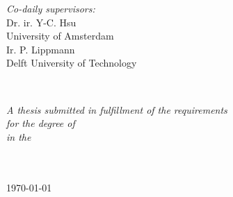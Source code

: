 \documentclass[
11pt, %
english, %
singlespacing, %
headsepline, %
]{MastersDoctoralThesis} %
\begin{document}
\begin{titlepage}
\begin{center}
\begin{minipage}[t]{0.5\textwidth}
            \begin{flushright} \large
                \emph{Co-daily supervisors:} \\
                Dr. ir. Y-C. Hsu\\
                University of Amsterdam\\
                \vspace{5mm}
                Ir. P. Lippmann\\
                Delft University of Technology\\
            \end{flushright}


        \end{minipage}\\[1.5cm]

        \vfill

        \large \textit{A thesis submitted in fulfillment of the requirements\\ for the degree of \degreename}\\[0.3cm] %
        \textit{in the}\\[0.4cm]
        \groupname\\\deptname\\[1cm] %

        \vfill

        {\large \today}\\[1cm] %

        \vfill
    \end{center}
\end{titlepage}


\end{document}
